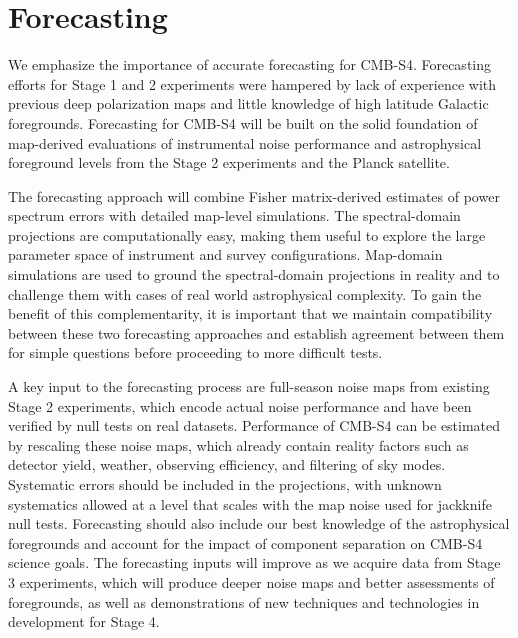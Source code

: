 
\section{Forecasting}

We emphasize the importance of accurate forecasting for CMB-S4.
Forecasting efforts for Stage 1 and 2 experiments were hampered by lack of experience with previous deep polarization maps and little knowledge of high latitude Galactic foregrounds.
Forecasting for CMB-S4 will be built on the solid foundation of map-derived evaluations of instrumental noise performance and astrophysical foreground levels from the Stage 2 experiments and the Planck satellite.

The forecasting approach will combine Fisher matrix-derived estimates of power spectrum errors with detailed map-level simulations.
The spectral-domain projections are computationally easy, making them useful to explore the large parameter space of instrument and survey configurations.
Map-domain simulations are used to ground the spectral-domain projections in reality and to challenge them with cases of real world astrophysical complexity.
To gain the benefit of this complementarity, it is important that we maintain compatibility between these two forecasting approaches and establish agreement between them for simple questions before proceeding to more difficult tests.

A key input to the forecasting process are full-season noise maps from existing Stage 2 experiments, which encode actual noise performance and have been verified by null tests on real datasets.
Performance of CMB-S4 can be estimated by rescaling these noise maps, which already contain reality factors such as detector yield, weather, observing efficiency, and filtering of sky modes.
Systematic errors should be included in the projections, with unknown systematics allowed at a level that scales with the map noise used for jackknife null tests.
Forecasting should also include our best knowledge of the astrophysical foregrounds and account for the impact of component separation on CMB-S4 science goals.
The forecasting inputs will improve as we acquire data from Stage 3 experiments, which will produce deeper noise maps and better assessments of foregrounds, as well as demonstrations of new techniques and technologies in development for Stage 4.

